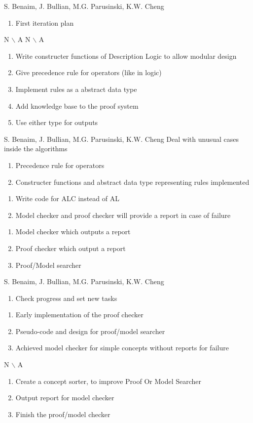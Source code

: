 %
{S. Benaim, J. Bullian, M.G. Parusinski, K.W. Cheng}%
{ \begin{enumerate} 
  \item First iteration plan
\end{enumerate} }%
{ N $\backslash$ A}%
{N $\backslash$ A}
{\begin{enumerate}
\item Write constructer functions of Description Logic to allow modular design
\item Give precedence rule for operators (like in logic)
\item Implement rules as a abstract data type
\item Add knowledge base to the proof system
\item Use either type for outputs
\end{enumerate}}%

%
{S. Benaim, J. Bullian, M.G. Parusinski, K.W. Cheng}%
{Deal with unusual cases inside the algorithms}%
{\begin{enumerate}
\item Precedence rule for operators
\item Constructer functions and abstract data type representing rules implemented
\end{enumerate}}%
{\begin{enumerate}
\item Write code for ALC instead of AL
\item Model checker and proof checker will provide a report in case of failure
\end{enumerate}}
{\begin{enumerate}
\item Model checker which outputs a report
\item Proof checker which output a report
\item Proof/Model searcher
\end{enumerate}}%

%
{S. Benaim, J. Bullian, M.G. Parusinski, K.W. Cheng}%
{\begin{enumerate} 
\item  Check progress and set new tasks
\end{enumerate} }%
{\begin{enumerate}
\item Early implementation of the proof checker
\item Pseudo-code and design for proof/model searcher
\item Achieved model checker for simple concepts without reports for failure
\end{enumerate}}%
{N $\backslash$ A}
{\begin{enumerate}
\item Create a concept sorter, to improve Proof Or Model Searcher
\item Output report for model checker
\item Finish the proof/model checker
\end{enumerate}}%

